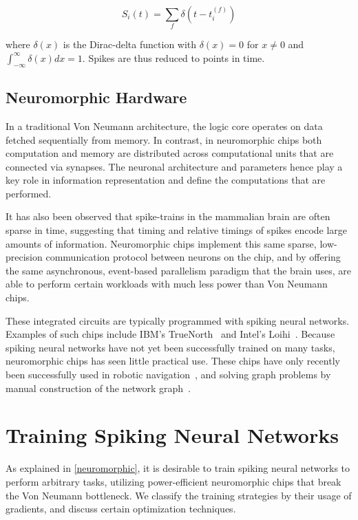 \documentclass[fyp]{socreport}
\begin{document}
\begin{equation} S_i(t) = \sum_{f} \delta\left( t - t_i^{(f)} \right)
\end{equation}

where \(\delta(x)\) is the Dirac-delta function with \(\delta(x) = 0\) for
\(x \ne 0\) and \(\int_{-\infty}^{\infty} \delta(x)dx = 1\). Spikes are thus
reduced to points in time.


\subsection{Neuromorphic Hardware\label{neuromorphic}}

In a traditional Von Neumann architecture, the logic core operates on data
fetched sequentially from memory. In contrast, in neuromorphic chips both
computation and memory are distributed across computational units that are
connected via synapses. The neuronal architecture and parameters hence play a
key role in information representation and define the computations that are
performed.

It has also been observed that spike-trains in the mammalian brain are often
sparse in time, suggesting that timing and relative timings of spikes encode
large amounts of information. Neuromorphic chips implement this same sparse,
low-precision communication protocol between neurons on the chip, and by
offering the same asynchronous, event-based parallelism paradigm that the brain
uses, are able to perform certain workloads with much less power than Von
Neumann chips.

These integrated circuits are typically programmed with spiking neural
networks. Examples of such chips include IBM's TrueNorth~\cite{Merolla668} and
Intel's Loihi~\cite{davies2018loihi}. Because spiking neural networks have not
yet been successfully trained on many tasks, neuromorphic chips has seen little
practical use. These chips have only recently been successfully used in robotic
navigation~\cite{SnnSlam}, and solving graph problems by manual construction of
the network graph~\cite{Severa2016SpikingNA}.

\section{Training Spiking Neural Networks\label{sec:train-spik-neur}}

As explained in \autoref{neuromorphic}, it is desirable to train spiking neural
networks to perform arbitrary tasks, utilizing power-efficient neuromorphic
chips that break the Von Neumann bottleneck. We classify the training strategies
by their usage of gradients, and discuss certain optimization techniques.
\end{document}
